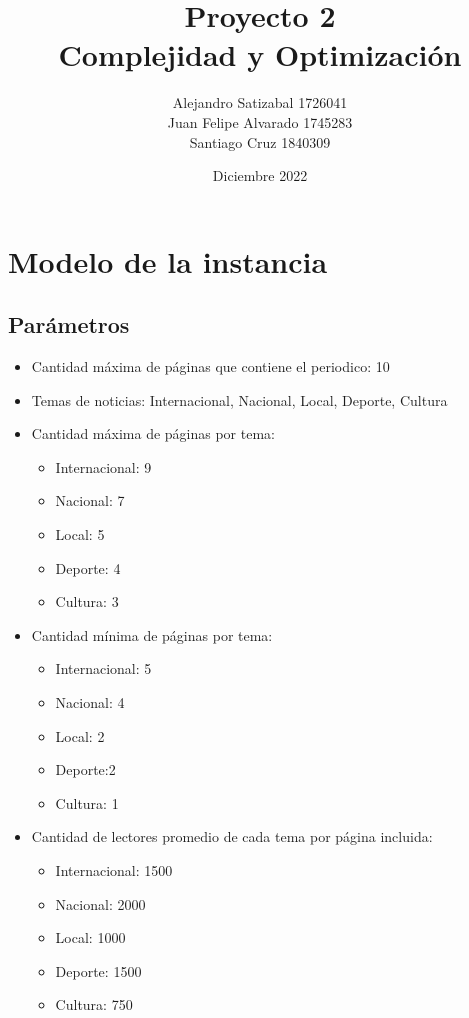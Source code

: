 \documentclass{article}
\title{Proyecto 2 \\ Complejidad y Optimización}
\author{Alejandro Satizabal 1726041 \\ Juan Felipe Alvarado 1745283 \\ Santiago Cruz 1840309}
\date{Diciembre 2022}
\begin{document}
\maketitle

\section{Modelo de la instancia}
\subsection{Parámetros}

\begin{itemize}
    \item Cantidad máxima de páginas que contiene el periodico: 10
    \item Temas de noticias:  Internacional, Nacional, Local, Deporte, Cultura
    \item Cantidad máxima de páginas por tema:
    \begin{itemize}
        \item Internacional: 9
        \item Nacional: 7
        \item Local: 5
        \item Deporte: 4
        \item Cultura: 3
    \end{itemize}
    \item Cantidad mínima de páginas por tema:
    \begin{itemize}
        \item Internacional: 5
        \item Nacional: 4
        \item Local: 2
        \item Deporte:2 
        \item Cultura: 1
    \end{itemize}
    \item Cantidad de lectores promedio de cada tema por página incluida:
    \begin{itemize}
        \item Internacional: 1500
        \item Nacional: 2000
        \item Local: 1000
        \item Deporte: 1500
        \item Cultura: 750
    \end{itemize}
\end{itemize}
\end{document}
